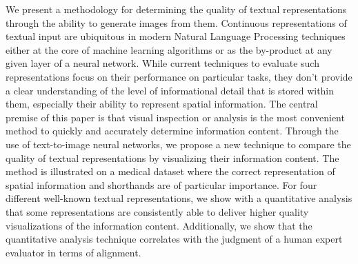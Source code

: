We present a methodology for determining the quality of textual representations through the ability to generate images from them. Continuous representations of textual input are ubiquitous in modern Natural Language Processing techniques either at the core of machine learning algorithms or as the by-product at any given layer of a neural network. While current techniques to evaluate such representations focus on their performance on particular tasks, they don't provide a clear understanding of the level of informational detail that is stored within them, especially their ability to represent spatial information. The central premise of this paper is that visual inspection or analysis is the most convenient method to quickly and accurately determine information content. Through the use of text-to-image neural networks, we propose a new technique to compare the quality of textual representations by visualizing their information content. The method is illustrated on a medical dataset where the correct representation of spatial information and shorthands are of particular importance. For four different well-known textual representations, we show with a quantitative analysis that some representations are consistently able to deliver higher quality visualizations of the information content. Additionally, we show that the quantitative analysis technique correlates with the judgment of a human expert evaluator in terms of alignment.

